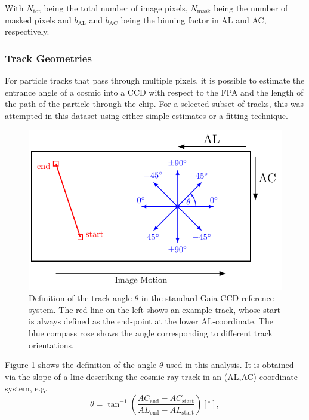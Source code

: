 \documentclass[a4paper, 11pt]{article}
\begin{document}
With $N_\mathrm{tot}$ being the total number of image pixels, $N_\mathrm{mask}$ being the number of masked pixels and $b_\mathrm{AL}$ and $b_\mathrm{AC}$ being the binning factor in AL and AC, respectively.


\subsubsection{Track Geometries}
\label{sec:track_geometry}
For particle tracks that pass through multiple pixels, it is possible to estimate the entrance angle of a cosmic into a CCD with respect to the FPA and the length of the path of the particle through the chip. For a selected subset of tracks, this was attempted in this dataset using either simple estimates or a fitting technique.

\begin{figure}
  \centering
  \includegraphics{images/postprocessing/theta_sketch}
  \caption{Definition of the track angle $\theta$ in the standard Gaia CCD reference system. The red line on the left shows an example track, whose start is always defined as the end-point at the lower AL-coordinate. The blue compass rose shows the angle corresponding to different track orientations.}
  \label{fig:theta_sketch}
\end{figure}
Figure \ref{fig:theta_sketch} shows the definition of the angle $\theta$ used in this analysis. It is obtained via the slope of a line describing the cosmic ray track in an (AL,AC) coordinate system, e.g. 
\begin{equation}
  \theta = \tan^{-1} \left( \frac{AC_\mathrm{end} - AC_\mathrm{start}}{AL_\mathrm{end} - AL_\mathrm{start}} \right) [^{\circ}],
  \label{eq:theta_def}
\end{equation}
\end{document}
